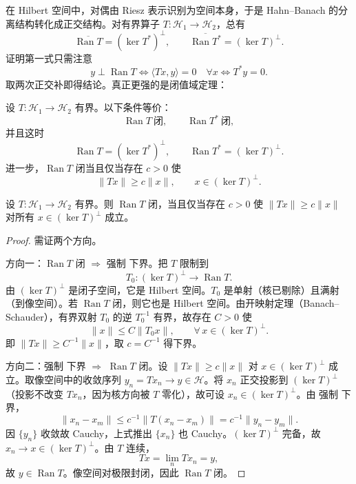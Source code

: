 在 Hilbert 空间中，对偶由 Riesz 表示识别为空间本身，于是 Hahn--Banach 的分离结构转化成正交结构。对有界算子 $T:\mathcal H_1\to\mathcal H_2$，总有
\[
\overline{\operatorname{Ran}T}
=(\ker T^*)^\perp,
\qquad
\overline{\operatorname{Ran}T^*}
=(\ker T)^\perp.
\]
证明第一式只需注意
\[
y\perp\operatorname{Ran}T
\iff
\langle Tx,y\rangle=0\quad\forall x
\iff
T^*y=0.
\]
取两次正交补即得结论。真正更强的是闭值域定理：

\begin{theorem}[闭值域定理]
设 $T:\mathcal H_1\to\mathcal H_2$ 有界。以下条件等价：
\[
\operatorname{Ran}T\ \text{闭},
\qquad
\operatorname{Ran}T^*\ \text{闭},
\]
并且这时
\[
\operatorname{Ran}T=(\ker T^*)^\perp,
\qquad
\operatorname{Ran}T^*=(\ker T)^\perp.
\]
进一步，$\operatorname{Ran}T$ 闭当且仅当存在 $c>0$ 使
\[
\boxed{
\|Tx\|\ge c\|x\|,
\qquad x\in(\ker T)^\perp
}.
\]
\end{theorem}

\begin{proposition}[闭值域与核补空间上的下界]
设 $T:\mathcal H_1\to\mathcal H_2$ 有界。则 $\operatorname{Ran}T$ 闭，当且仅当存在 $c>0$ 使 $\|Tx\|\ge c\|x\|$ 对所有 $x\in(\ker T)^\perp$ 成立。
\end{proposition}
\begin{proof}
需证两个方向。

方向一：$\operatorname{Ran}T$ 闭 $\Rightarrow$ 强制 下界。把 $T$ 限制到
\begin{equation*}
 T_0:(\ker T)^\perp\longrightarrow\operatorname{Ran}T.
\end{equation*}
由 $(\ker T)^\perp$ 是闭子空间，它是 Hilbert 空间。$T_0$ 是单射（核已剔除）且满射（到像空间）。若 $\operatorname{Ran}T$ 闭，则它也是 Hilbert 空间。由开映射定理（Banach--Schauder），有界双射 $T_0$ 的逆 $T_0^{-1}$ 有界，故存在 $C>0$ 使
\begin{equation*}
 \|x\|\le C\|T_0x\|,
 \qquad \forall\,x\in(\ker T)^\perp.
\end{equation*}
即 $\|Tx\|\ge C^{-1}\|x\|$，取 $c=C^{-1}$ 得下界。

方向二：强制 下界 $\Rightarrow$ $\operatorname{Ran}T$ 闭。设 $\|Tx\|\ge c\|x\|$ 对 $x\in(\ker T)^\perp$ 成立。取像空间中的收敛序列 $y_n=Tx_n\to y\in\mathcal H$。将 $x_n$ 正交投影到 $(\ker T)^\perp$（投影不改变 $Tx_n$，因为核方向被 $T$ 零化），故可设 $x_n\in(\ker T)^\perp$。由 强制 下界，
\begin{equation*}
 \|x_n-x_m\|
 \le c^{-1}\|T(x_n-x_m)\|
 =c^{-1}\|y_n-y_m\|.
\end{equation*}
因 $\{y_n\}$ 收敛故 Cauchy，上式推出 $\{x_n\}$ 也 Cauchy。$(\ker T)^\perp$ 完备，故 $x_n\to x\in(\ker T)^\perp$。由 $T$ 连续，
\begin{equation*}
 Tx=\lim_n Tx_n=y,
\end{equation*}
故 $y\in\operatorname{Ran}T$。像空间对极限封闭，因此 $\operatorname{Ran}T$ 闭。
\end{proof}


